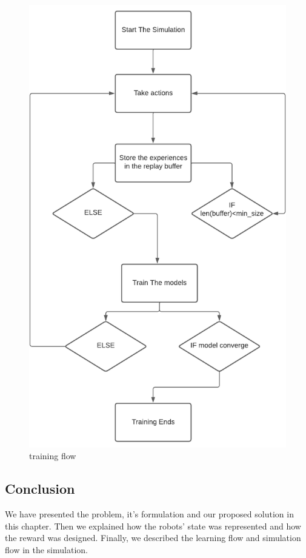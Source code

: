 \documentclass[12pt]{extarticle}
\begin{document}
 \begin{figure}[h]  
\centering
\includegraphics[scale=1.8]{training_workflow3}
\caption[training flow]{training flow}
\end{figure}

\subsection{Conclusion}
We have presented the problem, it's formulation and our proposed solution in this chapter. Then we explained how the robots' state was represented and how the reward was designed. Finally, we described the learning flow and simulation flow in the simulation.
\end{document}
